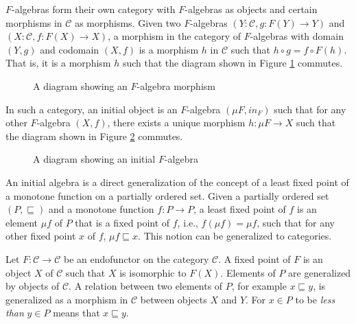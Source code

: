 \documentclass{msthesis}
\theoremstyle{definition}
\newcommand{\mcC}{\mathcal{C}}
\begin{document}
$F$-algebras form their own category with $F$-algebras as objects and certain morphisms in $\mcC$ as morphisms.  Given two $F$-algebras $(Y : \mcC, g : F(Y) \to Y)$ and $(X : \mcC, f : F(X) \to X)$, a morphism in the category of $F$-algebras with domain $(Y, g)$ and codomain $(X, f)$ is a morphism $h$ in $\mcC$ such that $h \circ g = f \circ F (h) $. That is, it is a morphism $h$ such that the diagram shown in Figure \ref{fig:falgmorphism} commutes.

\begin{figure}[htbp]
    \centering
    \caption{A diagram showing an $F$-algebra morphism}
    \label{fig:falgmorphism}
\end{figure}


In such a category, an initial object is an $F$-algebra $(\mu F, in_F)$ such that for any other $F$-algebra $(X, f)$, there exists a unique morphism $h : \mu F \to X$ such that the diagram shown in Figure \ref{fig:initialfalg} commutes.

\begin{figure}[htbp]
    \centering
    \caption{A diagram showing an initial $F$-algebra}
    \label{fig:initialfalg}
\end{figure}

An initial algebra is a direct generalization of the concept of a least fixed point of a monotone function on a partially ordered set.  Given a partially ordered set $(P, \sqsubseteq)$ and a monotone function $f : P \to P$, a least fixed point of $f$ is an element $\mu f$ of $P$ that is a fixed point of $f$, i.e., $f(\mu f) = \mu f$, such that for any other fixed point $x$ of $f$, $\mu f \sqsubseteq x$.  This notion can be generalized to categories.  

Let $F : \mcC \to \mcC$ be an endofunctor on the category $\mcC$.  A fixed point of $F$ is an object $X$ of $\mcC$ such that $X$ is isomorphic to $F(X)$.  Elements of $P$ are generalized by objects of $\mcC$.  A relation between two elements of $P$, for example $x \sqsubseteq y$, is generalized as a morphism in $\mcC$ between objects $X$ and $Y$.  For $x \in P$ to be \textit{less than} $y \in P$ means that $x \sqsubseteq y$.  
\end{document}

